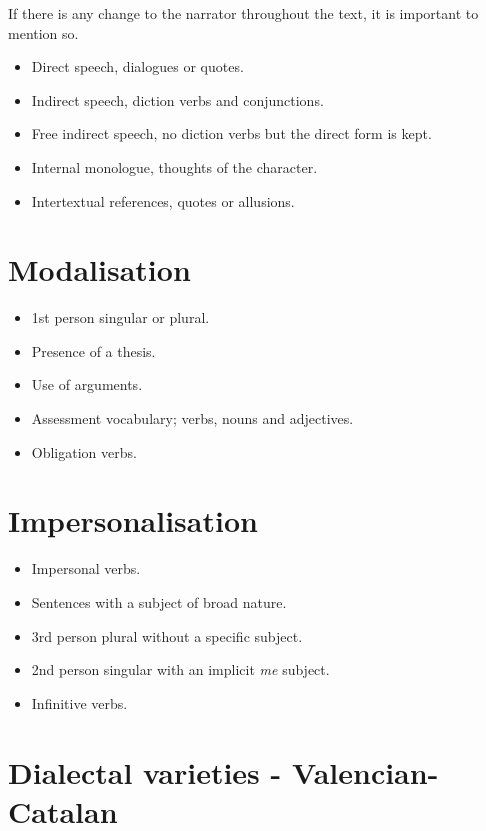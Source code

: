 \documentclass{article}
\begin{document}
If there is any change to the narrator throughout the text, it is important to
mention so.

\begin{itemize}
    \item Direct speech, dialogues or quotes.
    \item Indirect speech, diction verbs and conjunctions.
    \item Free indirect speech, no diction verbs but the direct form is kept.
    \item Internal monologue, thoughts of the character.
    \item Intertextual references, quotes or allusions.
\end{itemize}

\section*{Modalisation}

\begin{itemize}
    \item 1st person singular or plural.
    \item Presence of a thesis.
    \item Use of arguments.
    \item Assessment vocabulary; verbs, nouns and adjectives.
    \item Obligation verbs.
\end{itemize}

\section*{Impersonalisation}

\begin{itemize}
    \item Impersonal verbs.
    \item Sentences with a subject of broad nature.
    \item 3rd person plural without a specific subject.
    \item 2nd person singular with an implicit \emph{me} subject.
    \item Infinitive verbs.
\end{itemize}

\section*{Dialectal varieties - Valencian-Catalan}
\end{document}
